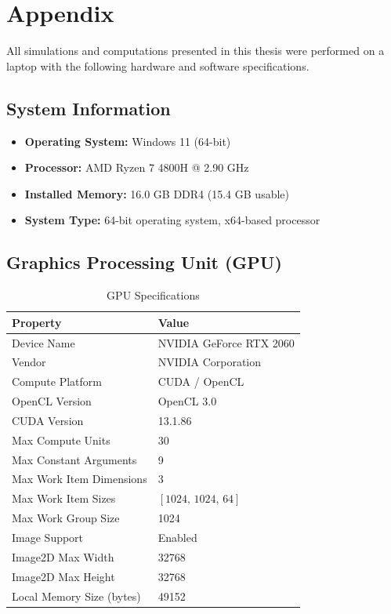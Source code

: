 \section{Appendix} 

All simulations and computations presented in this thesis were performed on a laptop with the following hardware and software specifications.

\subsection{System Information} \label{appendix:Computer Specifications}
\begin{itemize}
    \item \textbf{Operating System:} Windows 11 (64-bit)
    \item \textbf{Processor:} AMD Ryzen 7 4800H @ 2.90 GHz
    \item \textbf{Installed Memory:} 16.0 GB DDR4 (15.4 GB usable)
    \item \textbf{System Type:} 64-bit operating system, x64-based processor
\end{itemize}

\subsection{Graphics Processing Unit (GPU)}

\begin{table}[H]
    \centering
    \caption{GPU Specifications}
    \label{tab:gpu_specs}
    \begin{tabular}{|l|l|}
        \hline
        \textbf{Property}                & \textbf{Value} \\ \hline
        Device Name                      & NVIDIA GeForce RTX 2060 \\ \hline
        Vendor                           & NVIDIA Corporation \\ \hline
        Compute Platform                 & CUDA / OpenCL \\ \hline
        OpenCL Version                   & OpenCL 3.0 \\ \hline
        CUDA Version                     & 13.1.86 \\ \hline
        Max Compute Units                & 30 \\ \hline
        Max Constant Arguments           & 9 \\ \hline
        Max Work Item Dimensions         & 3 \\ \hline
        Max Work Item Sizes              & $[1024,\,1024,\,64]$ \\ \hline
        Max Work Group Size              & 1024 \\ \hline
        Image Support                    & Enabled \\ \hline
        Image2D Max Width                & 32768 \\ \hline
        Image2D Max Height               & 32768 \\ \hline
        Local Memory Size (bytes)        & 49152 \\ \hline
    \end{tabular}
\end{table}

